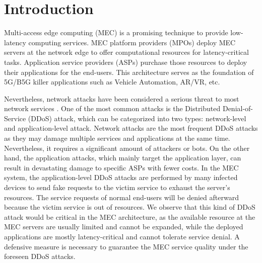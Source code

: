 \documentclass[10pt,journal, compsoc]{IEEEtran}
\begin{document}
%
\IEEEpeerreviewmaketitle
\section{Introduction}
Multi-access edge computing (MEC) is a promising technique to provide low-latency computing services. MEC platform providers (MPOs) deploy MEC servers at the network edge to offer computational resources for latency-critical tasks. Application service providers (ASPs) purchase those resources to deploy their applications for the end-users. This architecture serves as the foundation of 5G/B5G killer applications such as Vehicle Automation, AR/VR, etc.

Nevertheless, network attacks have been considered a serious threat to most network services \cite{Singh}. One of the most common attacks is the Distributed Denial-of-Service (DDoS) attack, which can be categorized into two types: network-level and application-level attack\cite{Zargar}. Network attacks are the most frequent DDoS attacks as they may damage multiple services and applications at the same time. Nevertheless, it requires a significant amount of attackers or bots. On the other hand, the application attacks, which mainly target the application layer, can result in devastating damage to specific ASPs \cite{Praseed} with fewer costs. In the MEC system, the application-level DDoS attacks are performed by many infected devices to send fake requests to the victim service to exhaust the server's resources\cite{Ranjan}. The service requests of normal end-users will be denied afterward because the victim service is out of resources. We observe that this kind of DDoS attack would be critical in the MEC architecture, as the available resource at the MEC servers are usually limited and cannot be expanded, while the deployed applications are mostly latency-critical and cannot tolerate service denial. A defensive measure is necessary to guarantee the MEC service quality under the foreseen DDoS attacks\cite{Tripathi}\cite{Agrawal}.
\end{document}
